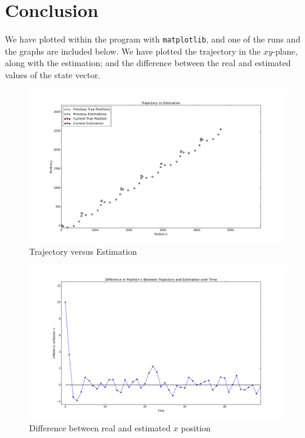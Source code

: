 \documentclass[12pt]{article}
\begin{document}
	\section{Conclusion}
	We have plotted within the program with \texttt{matplotlib}, and one of the runs and the graphs are included below. We have plotted the trajectory in the $xy$-plane, along with the estimation; and the difference between the real and estimated values of the state vector.
	\begin{figure}[H]
		\centering
		\includegraphics[width=\textwidth]{TvE}
		\caption{Trajectory versus Estimation}
	\end{figure}

	\begin{figure}[H]
		\centering
		\includegraphics[width=\textwidth]{Diffpx}
		\caption{Difference between real and estimated $x$ position}
	\end{figure}
\end{document}
